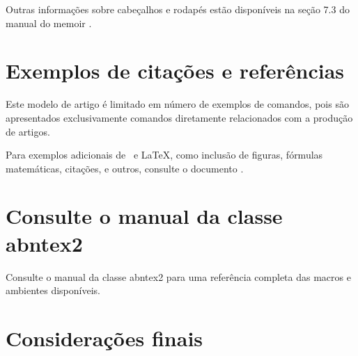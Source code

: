 \documentclass[
	article,			%
	11pt,				%
	oneside,			%
	a4paper,			%
	english,			%
	brazil,				%
	sumario=tradicional
	]{abntex2}
\begin{document}
   
Outras informações sobre cabeçalhos e rodapés estão disponíveis na seção 7.3 do
manual do \textsf{memoir} \cite{memoir}.

\section{Exemplos de citações e referências }

Este modelo de artigo é limitado em número de exemplos de comandos, pois são
apresentados exclusivamente comandos diretamente relacionados com a produção de
artigos.

Para exemplos adicionais de \abnTeX\ e \LaTeX, como inclusão de figuras,
fórmulas matemáticas, citações, e outros, consulte o documento .

\section{Consulte o manual da classe \textsf{abntex2}}

Consulte o manual da classe \textsf{abntex2} \cite{abntex2classe} para uma
referência completa das macros e ambientes disponíveis.

% 
\newpage
\section*{Considerações finais}

\lipsum[1] %

\begin{citacao}
\lipsum[2] %
\end{citacao}

\lipsum[3] %

\postextual



\end{document}
